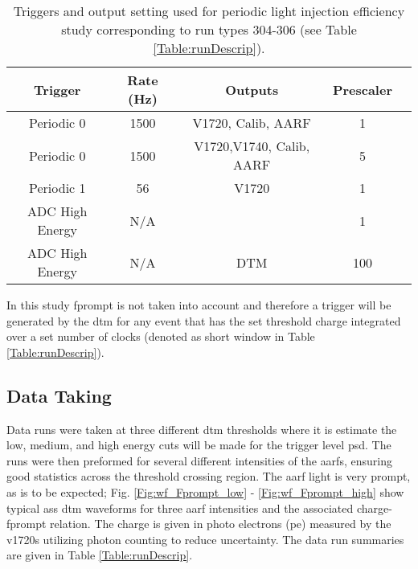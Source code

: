 \begin{table}[h]
\centering
\caption{Triggers and output setting used for periodic light injection efficiency study corresponding to run types 304-306 (see Table \ref{Table:runDescrip}).}
\vspace{0.2cm}
\begin{tabular}{c	c	c	c	c}
\hline
\hline
\textbf{Trigger}&		\textbf{Rate (Hz)}&		\textbf{Outputs}&		\textbf{Prescaler}\\
\hline
Periodic 0&			1500&		V1720, Calib, AARF&					1 \\
Periodic 0&			1500&		V1720,V1740, Calib, AARF&			5 \\
Periodic 1&			56&		V1720&								1 \\
ADC High Energy&	N/A&		&									1 \\
ADC High Energy&	N/A&		DTM&								100\\
\hline
\hline
\end{tabular}
\label{Table:trigSchemePeriodic}
\end{table}

In this study \gls{fprompt} is not taken into account and therefore a trigger will be generated by the \gls{dtm} for any event that has the set threshold charge integrated over a set number of clocks (denoted as short window in Table \ref{Table:runDescrip}).


\subsection{Data Taking}

Data runs were taken at three different \gls{dtm} thresholds where it is estimate the low, medium, and high energy cuts will be made for the trigger level \gls{psd}. The runs were then preformed for several different intensities of the \gls{aarf}s, ensuring good statistics across the threshold crossing region. The \gls{aarf} light is very prompt, as is to be expected; Fig. \ref{Fig:wf_Fprompt_low} - \ref{Fig:wf_Fprompt_high} show typical \gls{ass} \gls{dtm} waveforms for three \gls{aarf} intensities and the associated charge-\gls{fprompt} relation. The charge is given in photo electrons (\gls{pe}) measured by the \gls{v1720}s utilizing photon counting to reduce uncertainty. The data run summaries are given in Table \ref{Table:runDescrip}.

